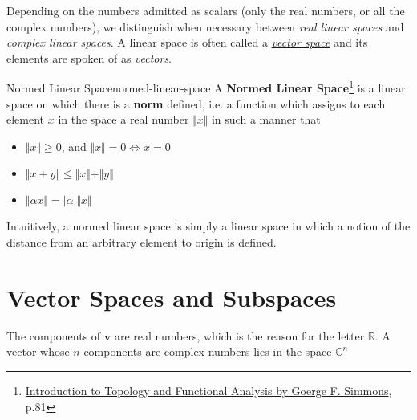 Depending on the numbers admitted as scalars (only the real numbers, or all the complex numbers), we distinguish when
necessary between \textit{real linear spaces} and \textit{complex linear spaces}. A linear space is often called a
\hyperlink{vector-space}{\textit{vector space}} and its elements are spoken of as \textit{vectors}.

\begin{Definition}{Normed Linear Space}{normed-linear-space}
    A \textbf{Normed Linear Space}\footnote{\href{https://trello.com/c/3EPccNTa}{Introduction to Topology and Functional Analysis by Goerge F. Simmons}, p.81}
    is a linear space on which there is a \textbf{norm} defined, i.e. a function which assigns to each element $x$ in
    the space a real number $\Vert x \Vert$ in such a manner that

    \begin{itemize}
        \item $\Vert x \Vert \ge 0$, and $\Vert x \Vert = 0 \iff x = 0$
        \item $\Vert x + y \Vert \le \Vert x \Vert + \Vert y \Vert$
        \item $\Vert \alpha x \Vert = \vert \alpha \vert \Vert x \Vert$
    \end{itemize}
\end{Definition}

Intuitively, a normed linear space is simply a linear space in which a notion of the distance from an arbitrary element
to origin is defined.

\section{Vector Spaces and Subspaces}


The components of $\boldsymbol{v}$ are real numbers, which is the reason for the letter $\mathbb{R}$. A vector whose $n$
components are complex numbers lies in the space $\mathbb{C}^n$

